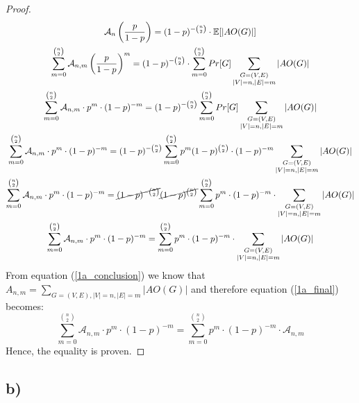 \documentclass[11pt,a4paper]{article}
\begin{document}
\begin{proof}
\begin{gather}
\mathcal{A}_n \left( \frac{p}{1-p} \right) = (1-p)^{-\binom{n}{2}} \cdot \mathbb{E}[|AO(G)|]\\
\sum_{m=0}^{\binom{n}{2}}\mathcal{A}_{n,m}\left(\frac{p}{1-p}\right)^m =(1-p)^{-\binom{n}{2}} \cdot
\sum_{m=0}^{\binom{n}{2}}Pr[G]\sum_{\substack{G=(V,E)\\|V|=n,|E|=m}} |AO(G)|\\
\sum_{m=0}^{\binom{n}{2}}\mathcal{A}_{n,m} \cdot p^m \cdot (1-p)^{-m} =
(1-p)^{-\binom{n}{2}}\sum_{m=0}^{\binom{n}{2}}Pr[G]\sum_{\substack{G=(V,E)\\|V|=n,|E|=m}} |AO(G)|\\
\sum_{m=0}^{\binom{n}{2}}\mathcal{A}_{n,m} \cdot p^m \cdot (1-p)^{-m} =
(1-p)^{-\binom{n}{2}}\sum_{m=0}^{\binom{n}{2}}p^m(1-p)^{\binom{n}{2}}\cdot (1-p)^{-m}\sum_{\substack{G=(V,E)\\|V|=n,|E|=m}} |AO(G)|\\
\sum_{m=0}^{\binom{n}{2}} \mathcal{A}_{n,m} \cdot p^m \cdot (1-p)^{-m} =
\cancel{(1-p)^{-\binom{n}{2}}}\cancel{(1-p)^{\binom{n}{2}}}\sum_{m=0}^{\binom{n}{2}}p^m\cdot (1-p)^{-m}\cdot \sum_{\substack{G=(V,E)\\|V|=n,|E|=m}} |AO(G)|\\
\sum_{m=0}^{\binom{n}{2}} \mathcal{A}_{n,m} \cdot p^m \cdot (1-p)^{-m} =
\sum_{m=0}^{\binom{n}{2}}p^m\cdot (1-p)^{-m}\cdot \sum_{\substack{G=(V,E)\\|V|=n,|E|=m}} |AO(G)|
\label{1a_final}
\end{gather}
From equation (\ref{1a_conclusion}) we know that $A_{n,m} = \sum_{G=(V,E), |V|=n, |E|=m} |AO(G)|$ and therefore
equation (\ref{1a_final}) becomes:
\begin{equation}
\sum_{m=0}^{\binom{n}{2}} \mathcal{A}_{n,m} \cdot p^m \cdot (1-p)^{-m} =
\sum_{m=0}^{\binom{n}{2}}p^m\cdot (1-p)^{-m}\cdot \mathcal{A}_{n,m}
\end{equation}
Hence, the equality is proven.
\end{proof}

\subsection*{b)}
\end{document}
